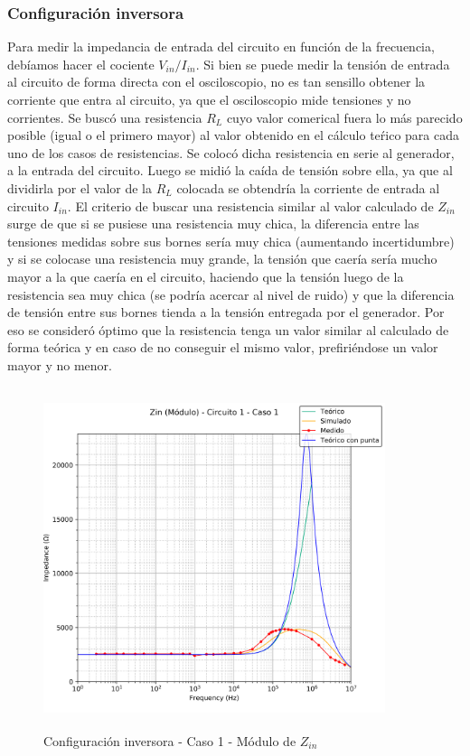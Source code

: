 \subsubsection*{Configuraci\'on inversora}
Para medir la impedancia de entrada del circuito en funci\'on de la frecuencia, deb\'iamos hacer el cociente $V_{in}/I_{in}$. Si bien se puede medir la tensi\'on de entrada al circuito de forma directa con el osciloscopio, no es tan sensillo obtener la corriente que entra al circuito, ya que el osciloscopio mide tensiones y no corrientes. Se busc\'o una resistencia $R_L$ cuyo valor comerical fuera lo m\'as parecido posible (igual o el primero mayor) al valor obtenido en el c\'alculo te\'rico para cada uno de los casos de resistencias. Se coloc\'o dicha resistencia en serie al generador, a la entrada del circuito. Luego se midi\'o la ca\'ida de tensi\'on sobre ella, ya que al dividirla por el valor de la $R_L$ colocada se obtendr\'ia la corriente de entrada al circuito $I_{in}$. El criterio de buscar una resistencia similar al valor calculado de $Z_{in}$ surge de que si se pusiese una resistencia muy chica, la diferencia entre las tensiones medidas sobre sus bornes ser\'ia muy chica (aumentando incertidumbre) y si se colocase una resistencia muy grande, la tensi\'on que caer\'ia ser\'ia mucho mayor a la que caer\'ia en el circuito, haciendo que la tensi\'on luego de la resistencia sea muy chica (se podr\'ia acercar al nivel de ruido) y que la diferencia de tensi\'on entre sus bornes tienda a la tensi\'on entregada por el generador. Por eso se consider\'o \'optimo que la resistencia tenga un valor similar al calculado de forma te\'orica y en caso de no conseguir el mismo valor, prefiri\'endose un valor mayor y no menor.

\begin{figure}[H] %
	\centering
	\includegraphics[width=10cm,height=10cm,keepaspectratio]{../EJ1/00GRAFICOS/c1c1/c1c1ZINpunta.png}
	\caption{Configuración inversora - Caso 1 - M\'odulo de $Z_{in}$}
	\label{c1c1zinM}
\end{figure}

